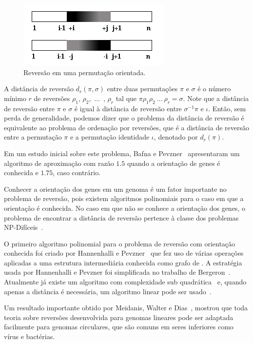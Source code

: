 \begin{figure}
  \centering
  \includegraphics{images/rev_orientada.png}
  \caption{Reversão em uma permutação orientada.}
  \label{fig:rev_orientada}
\end{figure}

A distância de reversão $d_{r}(\pi,\sigma)$ entre duas permutações
$\pi$ e $\sigma$ é o número mínimo $r$ de reversões $\rho_{1}$,
$\rho_{2}$,~$\ldots$~, $\rho_{r}$ tal que
$\pi \rho_{1} \rho_{2}~\ldots~\rho_{r} = \sigma$. Note que a distância
de reversão entre $\pi$ e $\sigma$ é igual à distância de reversão
entre $\sigma^{-1} \pi$ e $\iota$. Então, sem perda de generalidade,
podemos dizer que o problema da distância de reversão é equivalente ao
problema de ordenação por reversões, que é a distância de reversão
entre a permutação $\pi$ e a permutação identidade $\iota$, denotado
por $d_{r}(\pi)$.

Em um estudo inicial sobre este problema, Bafna e
Pevzner~\cite{BafnaPevzner*1996} apresentaram um algoritmo de
aproximação com razão $1.5$ quando a orientação de genes é conhecida e
$1.75$, caso contrário.

Conhecer a orientação dos genes em um genoma é um fator importante no
problema de reversão, pois existem algoritmos polinomiais para o caso
em que a orientação é conhecida. No caso em que não se conhece a
orientação dos genes, o problema de encontrar a distância de reversão
pertence à classe dos problemas NP-Difíceis~\cite{Caprara*1997}.

O primeiro algoritmo polinomial para o problema de reversão com
orientação conhecida foi criado por Hannenhalli e
Pevzner~\cite{HannenhalliPevzner*1995} que fez uso de várias operações
aplicadas a uma estrutura intermediária conhecida como grafo
de \bkp{}. A estratégia usada por Hannenhalli e Pevzner foi
simplificada no trabalho de Bergeron~\cite{Bergeron*2005}. Atualmente
já existe um algoritmo com complexidade
sub quadrática~\cite{TannierSagot*2004} e, quando apenas a distância é
necessária, um algoritmo linear pode ser
usado~\cite{BaderMoretYan*2001}.

Um resultado importante obtido por Meidanis, Walter e
Dias~\cite{MeidanisWalterDias*2000}, mostrou que toda teoria sobre
reversões desenvolvida para genomas lineares pode ser adaptada
facilmente para genomas circulares, que são comuns em seres inferiores
como vírus e bactérias.


